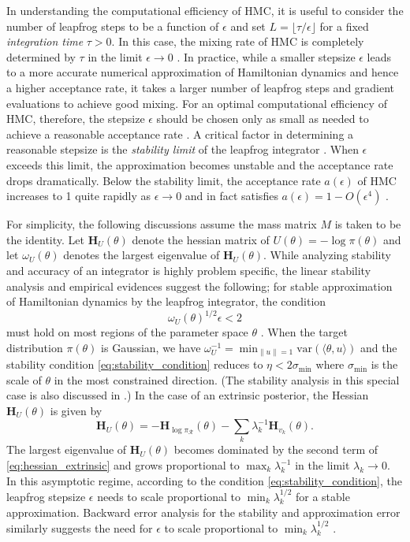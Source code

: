 \documentclass[10pt]{article}
\newcommand{\mc}[1]{\mathcal{#1}}
\DeclareMathOperator{\1}{\mathbbm{1}}
\newcommand{\dt}{\epsilon} %
\newcommand{\mass}{M} %
\newcommand{\hess}{\mathbf{H}} %
\begin{document}
In understanding the computational efficiency of HMC, it is useful to consider the number of leapfrog steps to be a function of $\dt$ and set $L = \lfloor \tau / \dt \rfloor$ for a fixed \textit{integration time} $\tau > 0$. In this case, the mixing rate of HMC is completely determined by $\tau$ in the limit $\dt \to 0$ \citep{betancourt17}. In practice, while a smaller stepsize $\dt$ leads to a more accurate numerical approximation of Hamiltonian dynamics and hence a higher acceptance rate, it takes a larger number of leapfrog steps and gradient evaluations to achieve good mixing. For an optimal computational efficiency of HMC, therefore, the stepsize $\dt$ should be chosen only as small as needed to achieve a reasonable acceptance rate \citep{beskos13, betancourt14}. A critical factor in determining a reasonable stepsize is the \textit{stability limit} of the leapfrog integrator \citep{neal2011mcmc}. When $\dt$ exceeds this limit, the approximation becomes unstable and the acceptance rate drops dramatically. Below the stability limit, the acceptance rate $a(\dt)$ of HMC increases to 1 quite rapidly as $\dt \to 0$ and in fact satisfies $a(\dt) = 1 - O(\dt^4)$ \citep{beskos13}.

For simplicity, the following discussions assume the mass matrix $\mass$ is taken to be the identity. Let $\hess_U(\theta)$ denote the hessian matrix of $U(\theta) = - \log \pi(\theta)$ and let $\omega_U(\theta)$ denotes the largest eigenvalue of $\hess_U(\theta)$. While analyzing stability and accuracy of an integrator is highly problem specific, the linear stability analysis and empirical evidences suggest the following; for stable approximation of Hamiltonian dynamics by the leapfrog integrator, the condition 
\begin{equation}
\label{eq:stability_condition}
\omega_U(\theta)^{1/2} \dt < 2
\end{equation} 
must hold on most regions of the parameter space $\theta$ \citep{hairer06}. When the target distribution $\pi(\theta)$ is Gaussian, we have $\omega_U^{-1} = \min_{\| u \| = 1} \textrm{var}(\langle \theta, u \rangle)$ and the stability condition \eqref{eq:stability_condition} reduces to $\eta < 2 \sigma_{\min}$ where $\sigma_{\min}$ is the scale of $\theta$ in the most constrained direction. (The stability analysis in this special case is also discussed in \cite{neal2011mcmc}.) In the case of an extrinsic posterior, the Hessian $\hess_U(\theta)$ is given by
\begin{equation}
\label{eq:hessian_extrinsic}
\hess_U(\theta) = -\hess_{\log \pi_{\mc R}}(\theta)  - \sum_k \lambda_k^{-1} \hess_{v_k}(\theta).
\end{equation}
The largest eigenvalue of $\hess_U(\theta)$ becomes dominated by the second term of \eqref{eq:hessian_extrinsic} and grows proportional to $\max_k \lambda_k^{-1}$ in the limit $\lambda_k \to 0$. In this asymptotic regime, according to the condition \eqref{eq:stability_condition}, the leapfrog stepsize $\dt$ needs to scale proportional to $\min_k \lambda_k^{1/2}$ for a stable approximation. Backward error analysis for the stability and approximation error similarly suggests the need for $\dt$ to scale proportional to $\min_k \lambda_k^{1/2}$ \citep{skeel2001modified}.
\end{document}
